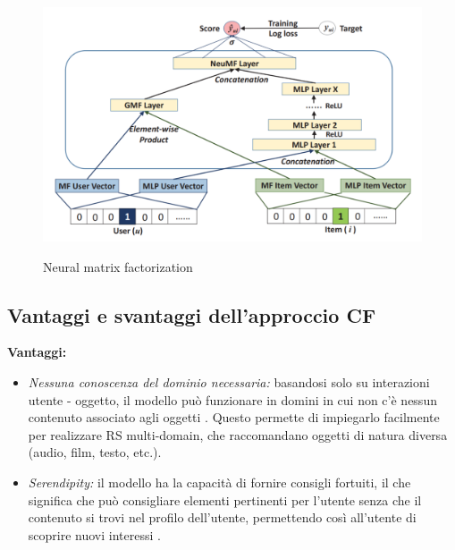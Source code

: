\begin{figure}
  \centering
  \includegraphics[width=\linewidth]{immagini/neumf.png}
  \caption{Neural matrix factorization}
  \cite{NCF}
  \label{fig:neumf}
\end{figure}


\subsection{Vantaggi e svantaggi dell'approccio CF} \label{ssec:pros-cons-cf}
\textbf{Vantaggi:}
\begin{itemize}

 \item \textit{Nessuna conoscenza del dominio necessaria:} basandosi solo su interazioni utente - oggetto, il modello può funzionare in domini in cui non c'è nessun contenuto associato agli oggetti \cite{recsys-principle-methods-evaluation}. Questo permette di impiegarlo facilmente per realizzare RS multi-domain, che raccomandano oggetti di natura diversa (audio, film, testo, etc.).
 
 \item \textit{Serendipity:} il modello ha la capacità di fornire consigli fortuiti, il che significa che può consigliare elementi pertinenti per l'utente senza che il contenuto si trovi nel profilo dell'utente, permettendo così all'utente di scoprire nuovi interessi \cite{recsys-principle-methods-evaluation} \cite{cf-advantages-google}.
\end{itemize}

